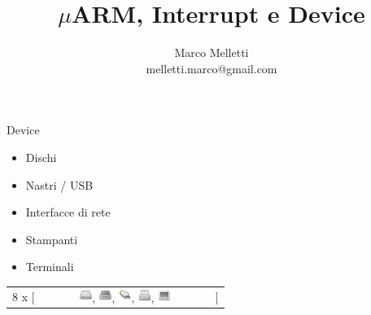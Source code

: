 \documentclass{beamer}
\title{$\mu$ARM, Interrupt e Device}
\author{Marco Melletti \\ melletti.marco@gmail.com}
\begin{document}
\frame{\titlepage}

\begin{frame}{Device}
	\begin{itemize}\itemsep10px
		\item Dischi 
		\item Nastri / USB
		\item Interfacce di rete
		\item Stampanti
		\item Terminali
	\end{itemize}

\vfill

\begin{tabular}[t]{rcl}
	\Huge 8 x [ & \Huge \includegraphics[width=0.08\textwidth]{disk-32.png}, 
	\includegraphics[width=0.08\textwidth]{tape-32.png},
	\includegraphics[width=0.08\textwidth]{network-32.png},
	\includegraphics[width=0.08\textwidth]{printer-32.png},
	\includegraphics[width=0.08\textwidth]{terminal-32.png} & \Huge ] \\
\end{tabular}
\end{frame}
\end{document}
